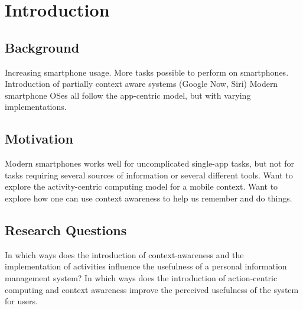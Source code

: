 
\chapter{Introduction} %

\label{Introduction} %



\section{Background}
Increasing smartphone usage.
More tasks possible to perform on smartphones.
Introduction of partially context aware systems (Google Now, Siri)
Modern smartphone OSes all follow the app-centric model, but with varying implementations.


\section{Motivation}
Modern smartphones works well for uncomplicated single-app tasks, but not for tasks requiring several sources of information or several different tools.
Want to explore the activity-centric computing model for a mobile context.
Want to explore how one can use context awareness to help us remember and do things.


\section{Research Questions}
In which ways does the introduction of context-awareness and the implementation of activities influence the usefulness of a personal information management system?
In which ways does the introduction of action-centric computing and context awareness improve the perceived usefulness of the system for users.

